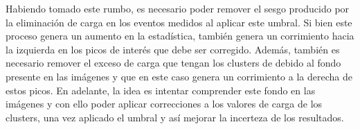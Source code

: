 Habiendo tomado este rumbo, es necesario poder remover el sesgo producido por la eliminación de carga en los eventos medidos al aplicar este umbral. Si bien este proceso genera un aumento en la estadística, también genera un corrimiento hacia la izquierda en los picos de interés que debe ser corregido. Además, también es necesario remover el exceso de carga que tengan los clusters de debido al fondo presente en las imágenes y que en este caso genera un corrimiento a la derecha de estos picos. En adelante, la idea es intentar comprender este fondo en las imágenes y con ello poder aplicar correcciones a los valores de carga de los clusters, una vez aplicado el umbral y así mejorar la incerteza de los resultados.

